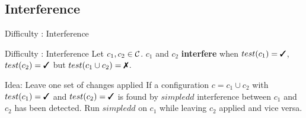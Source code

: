 \subsection{Interference}
\begin{frame}{Difficulty : Interference}

	\begin{alertblock}{Difficulty : Interference}
		Let $c_1,c_2 \in \mathcal{C}$. $c_1$ and $c_2$ \textbf{interfere} when $test(c_1)=\cmark$, $test(c_2)=\cmark$ but $test(c_1\cup c_2) = \xmark$.
	\end{alertblock}

	\bigskip
	\pause

	\begin{exampleblock}{Idea: Leave one set of changes applied}
		If a configuration $c = c_1 \cup c_2$ with $test(c_1)=\cmark$ and $test(c_2)=\cmark$ is found by $simpledd$ interference between $c_1$ and $c_2$ has been detected. Run $simpledd$ on $c_1$ while leaving $c_2$ applied and vice versa.
	\end{exampleblock}

\end{frame}
	
